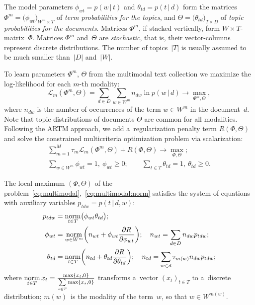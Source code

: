 \documentclass{llncs}
\newcommand{\norm}{\mathop{\rm norm}\limits}
\newcommand{\cond}{\mspace{3mu}{|}\mspace{3mu}}
\newcommand{\cL}{\mathscr{L}}
\begin{document}
The model parameters
$\phi_{wt}=p(w\cond t)$ and $\theta_{td}=p(t\cond d)$
form the matrices
$\Phi^m = \bigl( \phi_{wt} \bigr)_{W^m\times T}$ of \emph{term probabilities for the topics}, and
$\Theta = \bigl( \theta_{td} \bigr)_{T\times D}$ of \emph{topic probabilities for the documents}.
Matrices $\Phi^m$, if stacked vertically, form ${W\!\!\times\!T}$-matrix~$\Phi$.
Matrices $\Phi^m$ and~$\Theta$ are \emph{stochastic},
that is, their vector-columns represent discrete distributions.
The number of topics~$|T|$ is usually assumed to be much smaller than~$|D|$ and~$|W|$.

To learn parameters $\Phi^m$, $\Theta$ from the multimodal text collection
we maximize the log-likelihood for each $m$-th modality:
\[
    \cL_m (\Phi^m,\Theta) =
    \sum_{d\in D}\sum_{w\in W^m} n_{dw} \ln p(w\cond d)
    \to \max_{\Phi^m,\Theta},
\]
where
$n_{dw}$ is the number of occurrences of the term $w\in W^m$ in the document~$d$.
Note that topic distributions of documents $\Theta$ are common for all modalities.
Following the ARTM approach,
we add a~regularization penalty term $R(\Phi,\Theta)$
and solve the constrained multicriteria optimization problem via scalarization:
\begin{gather}
\label{eq:multimodal}
    \sum_{m=1}^M \tau_m \cL_m (\Phi^m,\Theta)
    + R(\Phi,\Theta)
    \to \max_{\Phi,\Theta};
\\\label{eq:multimodal:norm}
    \sum_{w\in W^m}\!\!\! \phi_{wt} = 1,~
    \phi_{wt}\geq 0;
    \qquad
    \sum_{t\in T} \theta_{td} = 1,~
    \theta_{td}\geq 0.
\end{gather}

The local maximum $(\Phi,\Theta)$
of the problem~\eqref{eq:multimodal},~\eqref{eq:multimodal:norm}
satisfies the system of equations
with auxiliary variables $p_{tdw} = p(t\cond d,w)$:
\begin{align}
    \label{eq:Estep}
    p_{tdw} &= \norm_{t\in T} \bigl(\phi_{wt}\theta_{td}\bigr);
\\
    \label{eq:Mstep:phi}
    \phi_{wt} &= \norm_{w\in W^m}
        \biggl(
            n_{wt} + \phi_{wt} \frac{\partial R}{\partial \phi_{wt}}
        \biggr);
    \quad
    n_{wt} = \sum_{d\in D} n_{dw} p_{tdw};
\\
    \label{eq:Mstep:theta}
    \theta_{td} &= \norm_{t\in T}
        \biggl(
            n_{td} + \theta_{td} \frac{\partial R}{\partial \theta_{td}}
        \biggr);
    \quad
    n_{td} =
        \sum_{w\in d} \tau_{m(w)} n_{dw} p_{tdw};
\end{align}
where
$\norm_{t\in T} x_t = \frac{\max\{x_t,0\}}{\sum\limits_{s\in T} \max\{x_s,0\}}$
transforms a~vector $(x_t)_{t\in T}$ to a~discrete distribution;
$m(w)$~is the modality of the term~$w$, so that $w\in W^{m(w)}$.
\end{document}
